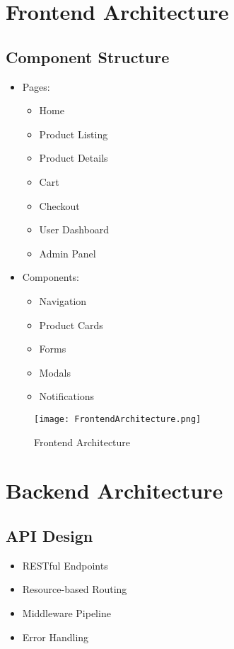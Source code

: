 \section{Frontend Architecture}
\subsection{Component Structure}
\begin{itemize}
    \item Pages:
    \begin{itemize}
        \item Home
        \item Product Listing
        \item Product Details
        \item Cart
        \item Checkout
        \item User Dashboard
        \item Admin Panel
    \end{itemize}
    \item Components:
    \begin{itemize}
        \item Navigation
        \item Product Cards
        \item Forms
        \item Modals
        \item Notifications
    \end{itemize}
\end{itemize}

\begin{figure}[h]
    \centering
    \texttt{[image: FrontendArchitecture.png]}
    \caption{Frontend Architecture}
    \label{fig:frontend-architecture}
\end{figure}

\section{Backend Architecture}
\subsection{API Design}
\begin{itemize}
    \item RESTful Endpoints
    \item Resource-based Routing
    \item Middleware Pipeline
    \item Error Handling
\end{itemize}

